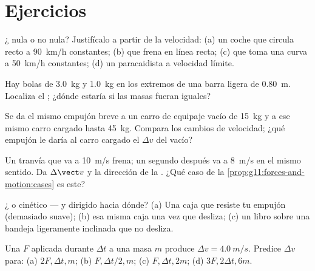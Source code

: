 \section{Ejercicios}

\begin{exercise}[$\star$]\label{exo:g11:forces-and-motion:1}
¿ nula o no nula? Justifícalo a partir de la velocidad: (a)
un coche que circula recto a \qty{90}{km/h} constantes; (b) que frena en
línea recta; (c) que toma una curva a \qty{50}{km/h} constantes; (d) un
paracaidista a velocidad límite.
\end{exercise}

\begin{exercise}[$\star$]\label{exo:g11:forces-and-motion:2}
Hay bolas de \qty{3.0}{kg} y \qty{1.0}{kg} en los extremos de una barra
ligera de \qty{0.80}{m}. Localiza el ; ¿dónde estaría si
las masas fueran iguales?
\end{exercise}

\begin{exercise}[$\star$]\label{exo:g11:forces-and-motion:3}
Se da el mismo empujón breve a un carro de equipaje vacío de
\qty{15}{kg} y a ese mismo carro cargado hasta \qty{45}{kg}. Compara los
cambios de velocidad; ¿qué empujón le daría al carro cargado el
$\Delta v$ del vacío?
\end{exercise}

\begin{exercise}[$\star$]\label{exo:g11:forces-and-motion:4}
Un tranvía que va a \qty{10}{m/s} frena; un segundo después va a
\qty{8}{m/s} en el mismo sentido. Da $\Delta \vect v$ y la dirección de
la . ¿Qué caso de la
\cref{prop:g11:forces-and-motion:cases} es este?
\end{exercise}

\begin{exercise}[$\star$]\label{exo:g11:forces-and-motion:5}
¿ o cinético --- y dirigido hacia dónde? (a) Una caja
que resiste tu empujón (demasiado suave); (b) esa misma caja una vez que
desliza; (c) un libro sobre una bandeja ligeramente inclinada que no
desliza.
\end{exercise}

\begin{exercise}[$\star\star$]\label{exo:g11:forces-and-motion:6}
Una  $F$ aplicada durante $\Delta t$ a una masa $m$ produce
$\Delta v = \qty{4.0}{m/s}$. Predice $\Delta v$ para: (a)
$2F, \Delta t, m$; (b) $F, \Delta t/2, m$; (c) $F, \Delta t, 2m$; (d)
$3F, 2\Delta t, 6m$.
\end{exercise}

